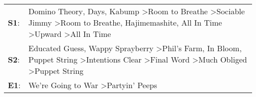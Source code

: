 \begin{supertabular}{p{0.03\textwidth}p{0.92\textwidth}}
 \textbf{S1}:  &  Domino Theory\textsuperscript{},  Days\textsuperscript{}, \enspace Kabump\textsuperscript{} \textgreater \enspace Room to Breathe\textsuperscript{} \textgreater \enspace Sociable Jimmy\textsuperscript{} \textgreater \enspace Room to Breathe\textsuperscript{}, \enspace Hajimemashite\textsuperscript{}, \enspace All In Time\textsuperscript{} \textgreater \enspace Upward\textsuperscript{} \textgreater \enspace All In Time\textsuperscript{}  \enspace  \\
 \textbf{S2}:  &                             Educated Guess\textsuperscript{}, \enspace Wappy Sprayberry\textsuperscript{} \textgreater \enspace Phil's Farm\textsuperscript{}, \enspace In Bloom\textsuperscript{}, \enspace Puppet String\textsuperscript{} \textgreater \enspace Intentions Clear\textsuperscript{} \textgreater \enspace Final Word\textsuperscript{} \textgreater \enspace Much Obliged\textsuperscript{} \textgreater \enspace Puppet String\textsuperscript{}  \enspace  \\
 \textbf{E1}:  &                                                                                                                                                                                                                                                                                                                                                                         We're Going to War\textsuperscript{} \textgreater \enspace Partyin' Peeps\textsuperscript{}  \enspace  \\
\end{supertabular}
